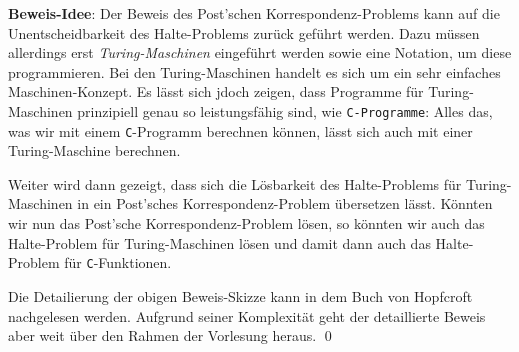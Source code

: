 \noindent
\textbf{Beweis-Idee}:  Der Beweis des Post'schen Korrespondenz-Problems kann auf die
Unentscheidbarkeit des Halte-Problems zur\"uck gef\"uhrt werden.  Dazu m\"ussen allerdings erst
\emph{Turing-Maschinen} eingef\"uhrt werden sowie eine Notation, um diese  programmieren.  
Bei den Turing-Maschinen handelt es sich um ein sehr einfaches
Maschinen-Konzept.  Es l\"asst sich jdoch zeigen, dass Programme f\"ur Turing-Maschinen
prinzipiell genau so leistungsf\"ahig sind, wie \texttt{C-Programme}:
Alles das, was wir mit einem \texttt{C}-Programm berechnen k\"onnen, l\"asst sich auch mit
einer Turing-Maschine berechnen.

Weiter wird dann gezeigt, dass sich die L\"osbarkeit des Halte-Problems f\"ur Turing-Maschinen
in ein Post'sches Korrespondenz-Problem \"ubersetzen l\"asst.  K\"onnten wir nun das Post'sche
Korrespondenz-Problem l\"osen, so k\"onnten wir auch das Halte-Problem f\"ur Turing-Maschinen
l\"osen und damit dann auch das Halte-Problem f\"ur \texttt{C}-Funktionen.

Die Detailierung der obigen Beweis-Skizze kann in dem Buch von Hopfcroft
\cite{hopcroft:06} nachgelesen werden.  Aufgrund seiner Komplexit\"at geht der detaillierte 
 Beweis aber weit \"uber den Rahmen der Vorlesung heraus.
\qed



